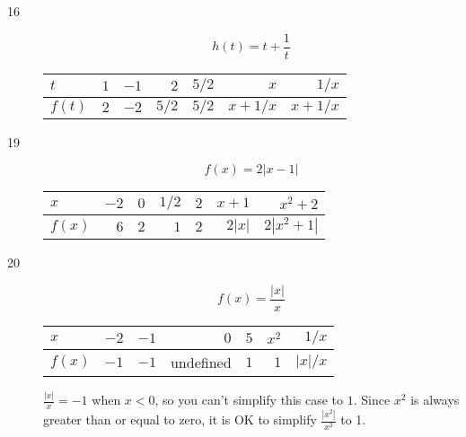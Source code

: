 \documentclass{exam}
\begin{document}
\begin{description}
\begin{comment}
  *****
    write ``undefined'' instead of $x \neq -1$.
  *****
\end{comment}

    \item[16]
      \[
        h(t) = t + \frac{1}{t}
      \]

      \begin{tabular}{lrrrrrr}
        \toprule
        $t$    & $1$ & $-1$ &   $2$ & $5/2$ &       $x$ &     $1/x$ \\ 
        \midrule
        $f(t)$ & $2$ &  $-2$ & $5/2$ & $5/2$ & $x + 1/x$ & $x + 1/x$ \\ 
        \bottomrule
      \end{tabular}

    \item[19]
      \[
        f(x) = 2 |x - 1|
      \]

      \begin{tabular}{lrrrrrr}
        \toprule
        $x$    & $-2$ & $0$ & $1/2$ & $2$ & $x + 1$ & $x^2 + 2$ \\ 
        \midrule
        $f(x)$ & $6$ &  $2$ &   $1$ & $2$ & $2 |x|$ & $2 |x^2 + 1|$ \\ 
        \bottomrule
      \end{tabular}

\begin{comment}
  *****
  You can't get rid of the absolute value sign in the $|x|$ case because $x$ might be negative.  It is OK to remove it
  for the $x^2 + 1$ case, since $x^2 + 1$ is always positive.
  *****
\end{comment}

    \item[20]
      \[
        f(x) = \frac{|x|}{x}
      \]

      \begin{tabular}{lrrrrrr}
        \toprule
        $x$      & $-2$ & $-1$ & $0$       & $5$ & $x^2$ & $1/x$ \\
        \midrule
        $f(x)$   & $-1$ & $-1$ & undefined & $1$ & $1$   & $|x|/x$ \\
        \bottomrule
      \end{tabular}

      $\frac{|x|}{x} = -1$ when $x < 0$, so you can't simplify this case to $1$.  Since $x^2$ is always greater than or
      equal to zero, it is OK to simplify $\frac{|x^2|}{x^2}$ to 1.

\begin{comment}
  *****
  $\frac{0}{0} \neq 1$
  *****
\end{comment}


\end{description}
\end{document}
